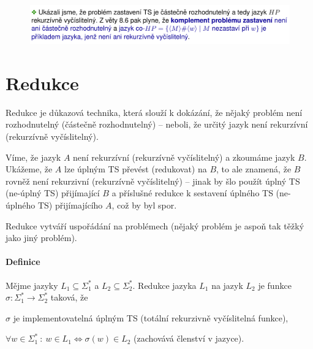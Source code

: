 \begin{figure}[H]
    \centering
    \includegraphics[width=1\linewidth]{diagonalizace_pr3_p4.pdf}
\end{figure}


\section{Redukce}

\begin{compactitem}
    \item Redukce je důkazová technika, která slouží k dokázání, že nějaký problém není rozhodnutelný (částečně rozhodnutelný) -- neboli, že určitý jazyk není rekurzívní (rekurzívně vyčíslitelný). \begin{compactitem}
        \item Víme, že jazyk $A$ není rekurzívní (rekurzívně vyčíslitelný) a zkoumáme jazyk $B$. Ukážeme, že $A$ lze úplným TS převést (redukovat) na $B$, to ale znamená, že $B$ rovněž není rekurzivní (rekurzívně vyčíslitelný) -- jinak by šlo použít úplný TS (ne-úplný TS) přijímající $B$ a příslušné redukce k sestavení úplného TS (ne-úplného TS) přijímajícího $A$, což by byl spor.
    \end{compactitem}

    \item Redukce vytváří uspořádání na problémech (nějaký problém je aspoň tak těžký jako jiný problém).

\end{compactitem}

\paragraph*{Definice} Mějme jazyky $L_1 \subseteq \Sigma_1^*$ a $L_2 \subseteq \Sigma_2^*$. Redukce jazyka $L_1$ na jazyk $L_2$ je funkce $\sigma : \Sigma_1^* \rightarrow \Sigma_2^*$ taková, že \begin{compactitem}
    \item $\sigma$ je implementovatelná úplným TS (totální rekurzivně vyčíslitelná funkce),
    \item $\forall w \in \Sigma_1^* ~:~ w \in L_1 \Leftrightarrow \sigma(w) \in L_2$ (zachovává členství v jazyce).
\end{compactitem}

